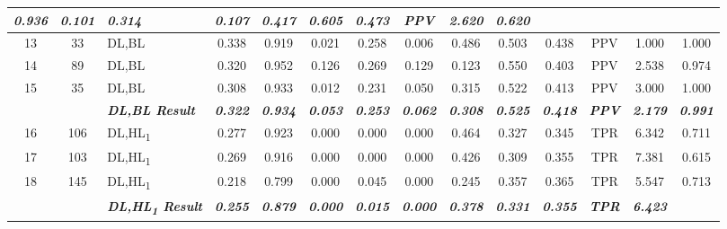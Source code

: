 \begin{table}[H]
{\begin{tabular}{cc|l|c|c|c|c|c|c|c|c|c|c|c|}
    \textit{\textbf{0.936}} &
    \textit{\textbf{0.101}} &
    \textit{\textbf{0.314}} &
    \textit{\textbf{0.107}} &
    \textit{\textbf{0.417}} &
    \textit{\textbf{0.605}} &
    \textit{\textbf{0.473}} &
    \textit{\textbf{PPV}} &
    \textit{\textbf{2.620}} &
    \textit{\textbf{0.620}} \\ \hline
  \multicolumn{1}{|c|}{13} &
    33 &
    DL,BL &
    0.338 &
    0.919 &
    0.021 &
    0.258 &
    0.006 &
    0.486 &
    0.503 &
    0.438 &
    PPV &
    1.000 &
    1.000 \\ \hline
  \multicolumn{1}{|c|}{14} &
    89 &
    DL,BL &
    0.320 &
    0.952 &
    0.126 &
    0.269 &
    0.129 &
    0.123 &
    0.550 &
    0.403 &
    PPV &
    2.538 &
    0.974 \\ \hline
  \multicolumn{1}{|c|}{15} &
    35 &
    DL,BL &
    0.308 &
    0.933 &
    0.012 &
    0.231 &
    0.050 &
    0.315 &
    0.522 &
    0.413 &
    PPV &
    3.000 &
    1.000 \\ \hline
  \textit{\textbf{}} &
    \textit{\textbf{}} &
    \textit{\textbf{DL,BL Result}} &
    \textit{\textbf{0.322}} &
    \textit{\textbf{0.934}} &
    \textit{\textbf{0.053}} &
    \textit{\textbf{0.253}} &
    \textit{\textbf{0.062}} &
    \textit{\textbf{0.308}} &
    \textit{\textbf{0.525}} &
    \textit{\textbf{0.418}} &
    \textit{\textbf{PPV}} &
    \textit{\textbf{2.179}} &
    \textit{\textbf{0.991}} \\ \hline
  \multicolumn{1}{|c|}{16} &
    106 &
    DL,HL\textsubscript{1} &
    0.277 &
    0.923 &
    0.000 &
    0.000 &
    0.000 &
    0.464 &
    0.327 &
    0.345 &
    TPR &
    6.342 &
    0.711 \\ \hline
  \multicolumn{1}{|c|}{17} &
    103 &
    DL,HL\textsubscript{1} &
    0.269 &
    0.916 &
    0.000 &
    0.000 &
    0.000 &
    0.426 &
    0.309 &
    0.355 &
    TPR &
    7.381 &
    0.615 \\ \hline
  \multicolumn{1}{|c|}{18} &
    145 &
    DL,HL\textsubscript{1} &
    0.218 &
    0.799 &
    0.000 &
    0.045 &
    0.000 &
    0.245 &
    0.357 &
    0.365 &
    TPR &
    5.547 &
    0.713 \\ \hline
  \textit{\textbf{}} &
    \textit{\textbf{}} &
    \textit{\textbf{DL,HL\textsubscript{1} Result}} &
    \textit{\textbf{0.255}} &
    \textit{\textbf{0.879}} &
    \textit{\textbf{0.000}} &
    \textit{\textbf{0.015}} &
    \textit{\textbf{0.000}} &
    \textit{\textbf{0.378}} &
    \textit{\textbf{0.331}} &
    \textit{\textbf{0.355}} &
    \textit{\textbf{TPR}} &
    \textit{\textbf{6.423}} &

\end{tabular}}
\end{table}
